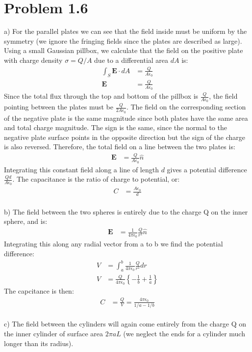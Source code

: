 \documentclass[a4paper,11pt]{article}
\numberwithin{equation}{section}
\newcommand{\bv}[1]{\mathbf{#1}}
\newcommand{\ez}{\epsilon_0}
\newcommand{\lrb}[1]{\left\{{#1}\right\}}
\begin{document}
\section{Problem 1.6}
a) For the parallel plates we can see that the field inside must be uniform by the symmetry (we ignore the fringing fields since the plates are described as large).
Using a small Gaussian pillbox, we calculate that the field on the positive plate with charge density $\sigma = Q/A$ due to a differential area $dA$ is:
\begin{align}
 \int_S \bv{E} \cdot dA &= \frac{Q}{A\ez}\\
 \bv{E} &= \frac{Q}{A\ez}
\end{align}
Since the total flux through the top and bottom of the pillbox is $\frac{Q}{A\ez}$, the field pointing between the plates must be $\frac{Q}{2A\ez}$.
The field on the corresponding section of the negative plate is the same magnitude since both plates have the same area and total charge magnitude.
The sign is the same, since the normal to the negative plate surface points in the opposite direction but the sign of the charge is also reversed.
Therefore, the total field on a line between the two plates is:
\begin{align}
 \bv{E} &= \frac{Q}{A\ez}\hat{n}
\end{align}
Integrating this constant field along a line of length $d$ gives a potential difference $\frac{Qd}{A\ez}$.
The capacitance is the ratio of charge to potential, or:
\begin{align}
 C &= \frac{A\ez}{d}
\end{align}
\\
b) The field between the two spheres is entirely due to the charge Q on the inner sphere, and is:
\begin{align}
 \bv{E} &= \frac{1}{4\pi\ez}\frac{Q}{r^2}\hat{n}
\end{align}
Integrating this along any radial vector from a to b we find the potential difference:
\begin{align}
 V &= \int_a^b \frac{1}{4\pi\ez}\frac{Q}{r^2} dr\\
 V &= \frac{Q}{4\pi\ez}\lrb{-\frac{1}{b}+\frac{1}{a}}
\end{align}
The capcitance is then:
\begin{align}
 C &= \frac{Q}{V} = \frac{4\pi\ez}{1/a-1/b}
\end{align}
\\
c) The field between the cylinders will again come entirely from the charge Q on the inner cylinder of surface area $2\pi a L$ (we neglect the ends for a cylinder much longer than its radius).
\end{document}
